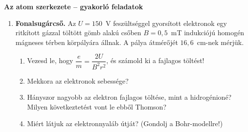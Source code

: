 \documentclass[12pt]{article}
\begin{document}
\begin{center}\vspace*{-0.4cm}
  {\Large\bfseries Az atom szerkezete -- gyakorló feladatok}\\[4pt]
\end{center}

\begin{minipage}[t]{0.68\linewidth}\vspace{0pt}
\begin{enumerate}
\item \textbf{Fonalsugárcső.} Az $U = 150$~V feszültséggel gyorsított elektronok egy
  ritkított gázzal töltött gömb alakú csőben $B = 0{,}5$~mT indukciójú homogén mágneses
  térben körpályára állnak. A pálya átmérőjét $16{,}6$~cm-nek mérjük.
  \begin{enumerate}
    \item Vezesd le, hogy $\dfrac{e}{m} = \dfrac{2U}{B^2r^2}$, és számold ki a fajlagos
      töltést!
    \item Mekkora az elektronok sebessége?
    \item Hányszor nagyobb az elektron fajlagos töltése, mint a hidrogénioné? Milyen
      következtetést vont le ebből Thomson?
    \item Miért látjuk az elektronnyaláb útját? (Gondolj a Bohr-modellre!)
  \end{enumerate}
\end{enumerate}
\end{minipage}\hfill
\begin{minipage}[t]{0.29\linewidth}\vspace{0pt}\centering
{}
\end{minipage}
\end{document}
